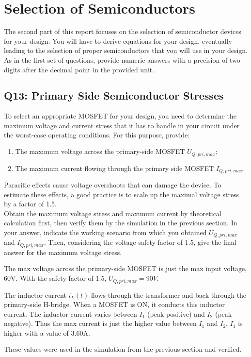 \documentclass{PELsmallreport}
\begin{document}
\hfill{}

\newpage

\section{Selection of Semiconductors}

The second part of this report focuses on the selection of semiconductor devices for your design. You will have to derive equations for your design, eventually leading to the selection of proper semiconductors that you will use in your design. As in the first set of questions, provide numeric answers with a precision of two digits after the decimal point in the provided unit.

\subsection{Q13: Primary Side Semiconductor Stresses} 
To select an appropriate MOSFET for your design, you need to determine the maximum voltage and current stress that it has to handle in your circuit under the worst-case operating conditions. For this purpose, provide:
\vspace{0.4em}
\begin{enumerate}[label=\alph*)]
    \item The maximum voltage across the primary-side MOSFET $U_{Q,pri,max}$;
    \item The maximum current flowing through the primary side MOSFET  $I_{Q,pri,max}$.
\end{enumerate} 

\vspace{1em}
Parasitic effects cause voltage overshoots that can damage the device. To estimate these effects, a good practice is to scale up the maximal voltage stress by a factor of 1.5. \\

Obtain the maximum voltage stress and maximum current by theoretical calculation first, then verify them by the simulation in the previous section. In your answer, indicate the working scenario from which you obtained $U_{Q,pri,max}$ and $I_{Q,pri,max}$. Then, considering the voltage safety factor of 1.5, give the final answer for the maximum voltage stress.

\begin{framed}
  \vspace{2em}
  The max voltage across the primary-side MOSFET is just the max input voltage, 60V. With the safety factor of 1.5, $U_{Q,pri,max} = 90V$.

  The inductor current $i_L(t)$ flows through the transformer and back through the primary-side H-bridge. When a MOSFET is ON, it conducts this inductor current. The inductor current varies between $I_1$ (peak positive) and $I_2$ (peak negative). Thus the max current is just the higher value between $I_1$ and $I_2$. $I_1$ is higher with a value of 3.60A. 

  These values were used in the simulation from the previous section and verified.
  \vspace{2em}
\end{framed}
\end{document}
